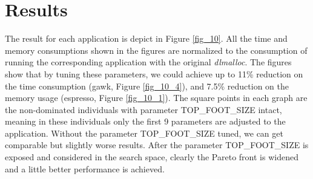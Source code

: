 
\section{Results}
\begin{figure*}[htbp]
	\centering
	\caption{Pareto-best individuals for each application, ``before exposure'' points are abtained without tuning TOP\_FOOT\_SIZE and ``after exposure'' points with TOP\_FOOT\_SIZE tuned. Less memory and time is better.}\label{fig_10}
\end{figure*}
The result for each application is depict in Figure \ref{fig_10}. All the time and memory consumptions shown in the figures are normalized to the consumption of running the corresponding application with the original \emph{dlmalloc}. The figures show that by tuning these parameters, we could achieve up to 11\% reduction on the time consumption (gawk, Figure \ref{fig_10_4}), and 7.5\% reduction on the memory usage (espresso, Figure \ref{fig_10_1}). The square points in each graph are the non-dominated individuals with parameter TOP\_FOOT\_SIZE intact, meaning in these individuals only the first 9 parameters are adjusted to the application. Without the parameter TOP\_FOOT\_SIZE tuned, we can get comparable but slightly worse results. After the parameter TOP\_FOOT\_SIZE is exposed and considered in the search space, clearly the Pareto front is widened and a little better performance is achieved.
